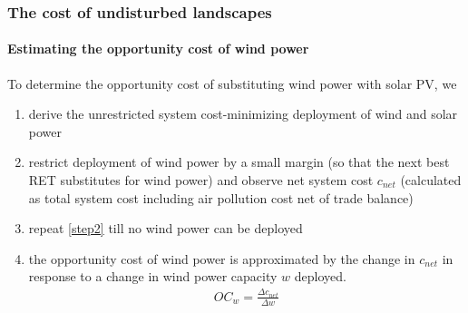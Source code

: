 \documentclass[aspectratio=1610, xcolor=dvipsnames,handout]{beamer} %
\begin{document}
    \begin{frame}
        \frametitle{The cost of undisturbed landscapes}
        \framesubtitle{Estimating the opportunity cost of wind power}
        To determine the opportunity cost of substituting wind power with solar PV, we
        \begin{enumerate}
            \item derive the unrestricted system cost-minimizing deployment of wind and solar power \label{step1}
            \item restrict deployment of wind power by a small margin (so that the next best RET substitutes for wind power) and
            observe net system cost $c_{net}$ (calculated as total system cost including air pollution cost net of trade balance) \label{step2}
            \item repeat \ref{step2} till no wind power can be deployed
            \item the opportunity cost of wind power is approximated by the change in $c_{net}$ in response to a change in wind
            power capacity $w$ deployed.
            \begin{align*}
                OC_w = \frac{\Delta c_{net}}{\Delta w}
            \end{align*}
        \end{enumerate}
    \end{frame}
\end{document}
